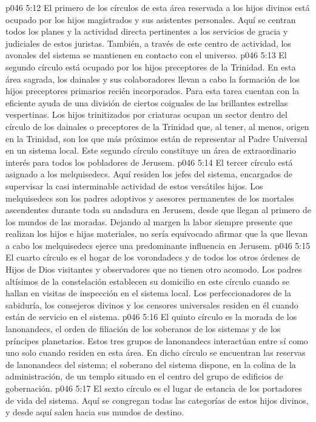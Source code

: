 \vs p046 5:12 El primero de los círculos de esta área reservada a los hijos divinos está ocupado por los hijos magistrados y sus asistentes personales. Aquí se centran todos los planes y la actividad directa pertinentes a los servicios de gracia y judiciales de estos juristas. También, a través de este centro de actividad, los avonales del sistema se mantienen en contacto con el universo.
\vs p046 5:13 El segundo círculo está ocupado por los hijos preceptores de la Trinidad. En esta área sagrada, los dainales y sus colaboradores llevan a cabo la formación de los hijos preceptores primarios recién incorporados. Para esta tarea cuentan con la eficiente ayuda de una división de ciertos coiguales de las brillantes estrellas vespertinas. Los hijos trinitizados por criaturas ocupan un sector dentro del círculo de los dainales o preceptores de la Trinidad que, al tener, al menos, origen en la Trinidad, son los que más próximos están de representar al Padre Universal en un sistema local. Este segundo círculo constituye un área de extraordinario interés para todos los pobladores de Jerusem.
\vs p046 5:14 El tercer círculo está asignado a los melquisedecs. Aquí residen los jefes del sistema, encargados de supervisar la casi interminable actividad de estos versátiles hijos. Los melquisedecs son los padres adoptivos y asesores permanentes de los mortales ascendentes durante toda su andadura en Jerusem, desde que llegan al primero de los mundos de las moradas. Dejando al margen la labor siempre presente que realizan los hijos e hijas materiales, no sería equivocado afirmar que la que llevan a cabo los melquisedecs ejerce una predominante influencia en Jerusem.
\vs p046 5:15 El cuarto círculo es el hogar de los vorondadecs y de todos los otros órdenes de Hijos de Dios visitantes y observadores que no tienen otro acomodo. Los padres altísimos de la constelación establecen su domicilio en este círculo cuando se hallan en visitas de inspección en el sistema local. Los perfeccionadores de la sabiduría, los consejeros divinos y los censores universales residen en él cuando están de servicio en el sistema.
\vs p046 5:16 El quinto círculo es la morada de los lanonandecs, el orden de filiación de los soberanos de los sistemas y de los príncipes planetarios. Estos tres grupos de lanonandecs interactúan entre sí como uno solo cuando residen en esta área. En dicho círculo se encuentran las reservas de lanonandecs del sistema; el soberano del sistema dispone, en la colina de la administración, de un templo situado en el centro del grupo de edificios de gobernación.
\vs p046 5:17 El sexto círculo es el lugar de estancia de los portadores de vida del sistema. Aquí se congregan todas las categorías de estos hijos divinos, y desde aquí salen hacia sus mundos de destino.
